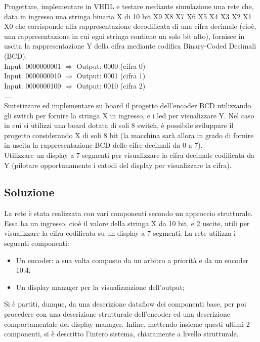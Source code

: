 \documentclass[12pt]{article}
\begin{document}
Progettare, implementare in VHDL e testare mediante simulazione una rete che, data in ingresso una stringa binaria X di 10 bit X9 X8 X7 X6 X5 X4 X3 X2 X1 X0 che corrisponde alla rappresentazione decodificata di una cifra decimale (cioè, una rappresentazione in cui ogni stringa contiene un solo bit alto), fornisce in uscita la rappresentazione Y della cifra mediante codifica Binary-Coded Decimali (BCD).
\\Input: 0000000001 $\Rightarrow$ Output: 0000 (cifra 0)
\\Input: 0000000010 $\Rightarrow$ Output: 0001 (cifra 1)
\\Input: 0000000100 $\Rightarrow$ Output: 0010 (cifra 2)
\\....
\\Sintetizzare ed implementare su board il progetto dell’encoder BCD utilizzando gli switch per fornire la stringa X in ingresso, e i led per visualizzare Y. Nel caso in cui si utilizzi una board dotata di soli 8 switch, è possibile sviluppare il progetto considerando X di soli 8 bit (la macchina sarà allora in grado di fornire in uscita la rappresentazione BCD delle cifre decimali da 0 a 7).
\\Utilizzare un display a 7 segmenti per visualizzare la cifra decimale codificata da Y (pilotare opportunamente i catodi del display per visualizzare la cifra).
\subsection{Soluzione}
La rete è stata realizzata con vari componenti secondo un approccio strutturale. Essa ha un ingresso, cioè il valore della stringa X da 10 bit, e 2 uscite, utili per visualizzare la cifra codificata su un display a 7 segmenti.
La rete utilizza i seguenti componenti:
\begin{itemize}
    \item Un encoder: a sua volta composto da un arbitro a priorità e da un encoder 10:4;
    \item Un display manager per la visualizzazione dell’output;
\end{itemize}
Si è partiti, dunque, da una descrizione dataflow dei componenti base, per poi procedere con una descrizione strutturale dell’encoder ed una descrizione comportamentale del display manager. Infine, mettendo insieme questi ultimi 2 componenti, si è descritto l’intero sistema, chiaramente a livello strutturale.
\end{document}
